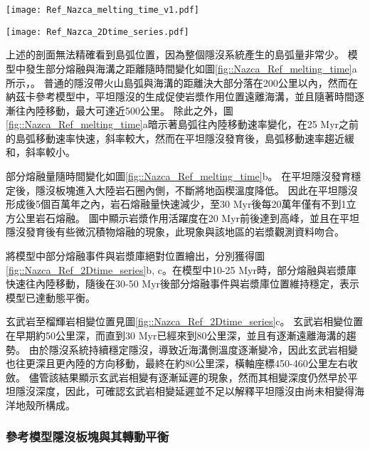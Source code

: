 \begin{figure*}[ht]
    \centering
    \texttt{[image: Ref\_Nazca\_melting\_time\_v1.pdf]}
    \caption[納茲卡參考模型岩漿作用隨時間變化]{納茲卡參考模型岩漿作用隨時間變化。}
    \label{fig::Nazca_Ref_melting_time}
\end{figure*}

\begin{figure*}[ht]
    \centering
    \texttt{[image: Ref\_Nazca\_2Dtime\_series.pdf]}
    \caption[納茲卡參考模型部分熔融、岩漿庫與玄武岩相變時空關係圖]{納茲卡參考模型部分熔融、岩漿庫與玄武岩相變時空關係圖。}
    \label{fig::Nazca_Ref_2Dtime_series}
\end{figure*}

上述的剖面無法精確看到島弧位置，因為整個隱沒系統產生的島弧量非常少。
模型中發生部分熔融與海溝之距離隨時間變化如圖\ref{fig::Nazca_Ref_melting_time}a所示，。
普通的隱沒帶火山島弧與海溝的距離決大部分落在200公里以內，然而在納茲卡參考模型中，平坦隱沒的生成促使岩漿作用位置遠離海溝，並且隨著時間逐漸往內陸移動，最大可達近500公里。
除此之外，圖\ref{fig::Nazca_Ref_melting_time}a暗示著島弧往內陸移動速率變化，在25 Myr之前的島弧移動速率快速，斜率較大，然而在平坦隱沒發育後，島弧移動速率趨近緩和，斜率較小。

部分熔融量隨時間變化如圖\ref{fig::Nazca_Ref_melting_time}b。
在平坦隱沒發育穩定後，隱沒板塊進入大陸岩石圈內側，不斷將地函楔溫度降低。
因此在平坦隱沒形成後5個百萬年之內，岩石熔融量快速減少，至30 Myr後每20萬年僅有不到1立方公里岩石熔融。
圖中顯示岩漿作用活躍度在20 Myr前後達到高峰，並且在平坦隱沒發育後有些微沉積物熔融的現象，此現象與該地區的岩漿觀測資料吻合。

將模型中部分熔融事件與岩漿庫絕對位置繪出，分別獲得圖\ref{fig::Nazca_Ref_2Dtime_series}b, c。在模型中10-25 Myr時，部分熔融與岩漿庫快速往內陸移動，隨後在30-50 Myr後部分熔融事件與岩漿庫位置維持穩定，表示模型已達動態平衡。

玄武岩至榴輝岩相變位置見圖\ref{fig::Nazca_Ref_2Dtime_series}c。
玄武岩相變位置在早期約50公里深，而直到30 Myr已經來到80公里深，並且有逐漸遠離海溝的趨勢。
由於隱沒系統持續穩定隱沒，導致近海溝側溫度逐漸變冷，因此玄武岩相變也往更深且更內陸的方向移動，最終在約80公里深，橫軸座標450-460公里左右收斂。
儘管該結果顯示玄武岩相變有逐漸延遲的現象，然而其相變深度仍然早於平坦隱沒深度，因此，可確認玄武岩相變延遲並不足以解釋平坦隱沒由尚未相變得海洋地殼所構成。

\subsubsection{參考模型隱沒板塊與其轉動平衡}

